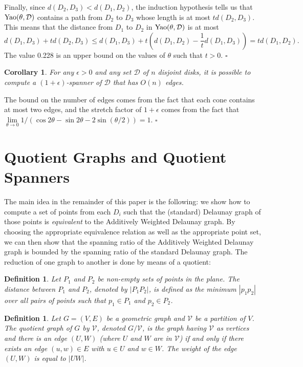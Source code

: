 \documentclass[pdftex,leqno,fleqn,12pt]{article}
\newcommand{\YAO}{{\rm{Yao}}}
\newtheorem{corollary}[theorem]{Corollary}
\newtheorem{definition}[theorem]{Definition}
\newenvironment{proof}{{\textit Proof:} \rm}{\hfill $\square$ \medskip\\}
\begin{document}
\begin{proof}
Finally, since $d(D_2,D_3)<d(D_1,D_2)$, the induction hypothesis tells us that
$\YAO(\theta,\mathcal{D})$ contains a path from $D_2$ to $D_3$ whose length is at most
$td(D_2,D_3)$. This means that the distance from $D_1$ to $D_2$ in $\YAO(\theta,\mathcal{D})$ is at
most
$$d(D_1,D_3)+td(D_2,D_3)\leq d(D_1,D_3) + t(d(D_1,D_2)-\frac{1}{t}d(D_1,D_3))=td(D_1,D_2).$$
The value 0.228 is an upper bound on the values of $\theta$ such that $t>0$.
\end{proof}



\begin{corollary} For any $\epsilon>0$ and any set $\mathcal{D}$ of $n$ disjoint disks, it is
possible to compute a $(1+\epsilon)$-spanner of $\mathcal{D}$ that has $O(n)$ edges.
\end{corollary}
\begin{proof} The bound on the number of edges comes from the fact that each cone contains at most
two edges, and the stretch factor of $1+\epsilon$ comes from the fact that
$\lim\limits_{\theta\rightarrow 0}1/(\cos 2\theta-\sin 2\theta-2\sin(\theta/2))=1$.
\end{proof}

\section{Quotient Graphs and Quotient Spanners}\label{section-disk-del-quotient}

The main idea in the remainder of this paper is the following: we show how to compute a set of points
from each $D_i$ such that the (standard) Delaunay graph of those points is \emph{equivalent} to the
Additively Weighted Delaunay graph. By choosing the appropriate equivalence relation as well as the
appropriate point set, we can then show that the spanning ratio of the Additively Weighted Delaunay
graph is bounded by the spanning ratio of the standard Delaunay graph. The reduction of one graph
to another is done by means of a quotient:


\begin{definition} Let $P_1$ and $P_2$ be non-empty sets of points in the plane.
The \emph{distance} between $P_1$ and $P_2$, denoted by $|P_1P_2|$, is defined as the minimum $|p_1p_2|$
over all pairs of points such that $p_1\in P_1$ and $p_2\in P_2$.
\end{definition}

\begin{definition}Let $G=(V,E)$ be a geometric graph
and $\mathcal{V}$ be a partition of $V$. The \emph{quotient graph} of $G$ by $\mathcal{V}$, denoted
$G/\mathcal{V}$, is the graph having $\mathcal{V}$ as vertices and there is an edge $(U,W)$ (where
$U$ and $W$ are in $\mathcal{V}$) if and only if there exists an edge $(u,w)\in E$ with $u\in U$
and $w\in W$. The weight of the edge $(U,W)$ is equal to $|UW|$.
\end{definition}
\end{document}

